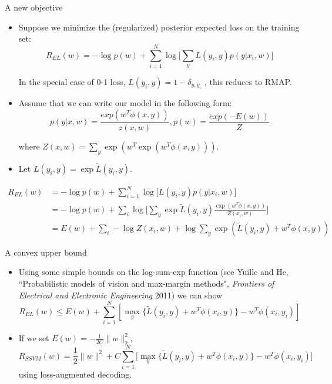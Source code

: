 \documentclass[10pt,mathserif]{beamer}
\begin{document}
\begin{frame}{A new objective}
\begin{itemize}
    \item Suppose we minimize the (regularized) posterior expected loss on the training set:
    \begin{equation}
        R_{EL}(w) = -\log p(w) + \sum_{i=1}^N \log\bigg[\sum_y L(y_i , y)p(y|x_i , w)\bigg]
    \end{equation}
    
    In the special case of 0-1 loss, $L(y_i , y) = 1 - \delta_{y,y_i}$ , this reduces to RMAP.
    \item Assume that we can write our model in the following form:
    \begin{equation}
        p(y|x, w) = \frac{exp(w^T \phi(x, y))}{z(x,w)}, p(w) = \frac{exp(-E (w))}{Z}
    \end{equation}
    
    where $Z(x,w) = \sum_y \exp(w^T \exp(w^T \phi(x,y))).$
    
    \item Let $L(y_i,y) = \exp\tilde{L}(y_i,y)$.
\end{itemize}
\begin{equation}
    \begin{split}
        R_{EL}(w) & = - \log p(w) + \sum_{i=1}^N \log \bigg[L(y_i, y)p(y|x_i , w)\bigg]\\
        & = -\log p(w) + \sum_i\log \bigg[\sum_y\exp\tilde{L}(y_i,y) \frac{\exp(w^T \phi(x,y))}{Z(x_i,w)}\bigg]\\
        & = E(w) + \sum_i -\log Z(x_i,w) + \log\sum_y \exp(\tilde{L}(y_i,y) + w^T \phi(x,y)) 
    \end{split}
\end{equation}
\end{frame}

\begin{frame}{A convex upper bound}
\begin{itemize}
    \item Using some simple bounds on the log-sum-exp function (see Yuille and He, ``Probabilistic models of vision and max-margin methods", \textit{Frontiers of Electrical and Electronic Engineering} 2011) we can show
    \begin{equation}
        R_{EL}(w)\leq E(w) + \sum_{i=1}^N [\max_y\{\tilde{L}(y_i,y) + w^T \phi(x_i,y)\} - w^T \phi(x_i,y_i) ]
    \end{equation}
    
    \item If we set $E(w)= -\frac{1}{2C} \|w\|_2^2$,
    \begin{equation}
        R_{SSVM}(w) = \frac{1}{2}\|w\|^2 + C\sum_{i=1}^N\bigg[\max_y\{\tilde{L}(y_i,y) + w^T \phi(x_i,y)\} - w^T \phi(x_i,y_i)\bigg]
    \end{equation}
    using loss-augmented decoding.
\end{itemize}
\end{frame}
   
\end{document}
